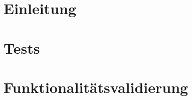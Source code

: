 

	\maketitle
	\setcounter{tocdepth}{1}
	\tableofcontents

	\chapter{Einleitung}
		
	\chapter{Tests}
	\label{chap:test}
		
	\chapter{Funktionalitätsvalidierung}
		

